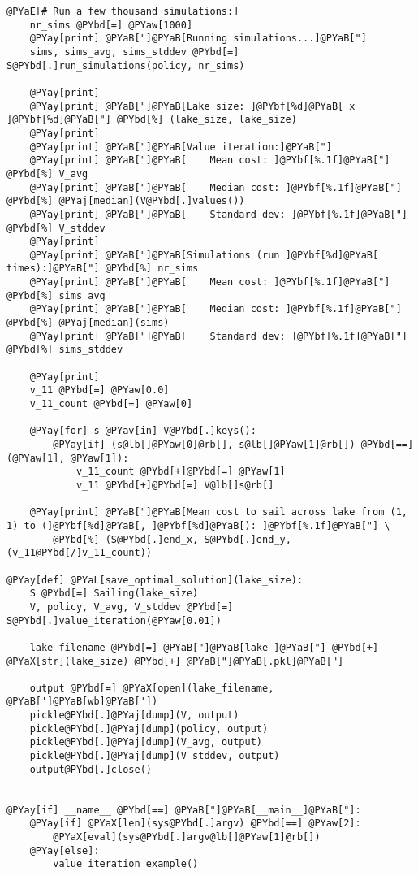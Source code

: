 \begin{Verbatim}[commandchars=@\[\]]
    @PYaE[# Run a few thousand simulations:]
    nr_sims @PYbd[=] @PYaw[1000]
    @PYay[print] @PYaB["]@PYaB[Running simulations...]@PYaB["]
    sims, sims_avg, sims_stddev @PYbd[=] S@PYbd[.]run_simulations(policy, nr_sims)

    @PYay[print]
    @PYay[print] @PYaB["]@PYaB[Lake size: ]@PYbf[%d]@PYaB[ x ]@PYbf[%d]@PYaB["] @PYbd[%] (lake_size, lake_size)
    @PYay[print]
    @PYay[print] @PYaB["]@PYaB[Value iteration:]@PYaB["]
    @PYay[print] @PYaB["]@PYaB[    Mean cost: ]@PYbf[%.1f]@PYaB["] @PYbd[%] V_avg
    @PYay[print] @PYaB["]@PYaB[    Median cost: ]@PYbf[%.1f]@PYaB["] @PYbd[%] @PYaj[median](V@PYbd[.]values())
    @PYay[print] @PYaB["]@PYaB[    Standard dev: ]@PYbf[%.1f]@PYaB["] @PYbd[%] V_stddev
    @PYay[print]
    @PYay[print] @PYaB["]@PYaB[Simulations (run ]@PYbf[%d]@PYaB[ times):]@PYaB["] @PYbd[%] nr_sims
    @PYay[print] @PYaB["]@PYaB[    Mean cost: ]@PYbf[%.1f]@PYaB["] @PYbd[%] sims_avg
    @PYay[print] @PYaB["]@PYaB[    Median cost: ]@PYbf[%.1f]@PYaB["] @PYbd[%] @PYaj[median](sims)
    @PYay[print] @PYaB["]@PYaB[    Standard dev: ]@PYbf[%.1f]@PYaB["] @PYbd[%] sims_stddev

    @PYay[print]
    v_11 @PYbd[=] @PYaw[0.0]
    v_11_count @PYbd[=] @PYaw[0]

    @PYay[for] s @PYav[in] V@PYbd[.]keys():
        @PYay[if] (s@lb[]@PYaw[0]@rb[], s@lb[]@PYaw[1]@rb[]) @PYbd[==] (@PYaw[1], @PYaw[1]):
            v_11_count @PYbd[+]@PYbd[=] @PYaw[1]
            v_11 @PYbd[+]@PYbd[=] V@lb[]s@rb[]

    @PYay[print] @PYaB["]@PYaB[Mean cost to sail across lake from (1, 1) to (]@PYbf[%d]@PYaB[, ]@PYbf[%d]@PYaB[): ]@PYbf[%.1f]@PYaB["] \
        @PYbd[%] (S@PYbd[.]end_x, S@PYbd[.]end_y, (v_11@PYbd[/]v_11_count))

@PYay[def] @PYaL[save_optimal_solution](lake_size):
    S @PYbd[=] Sailing(lake_size)
    V, policy, V_avg, V_stddev @PYbd[=] S@PYbd[.]value_iteration(@PYaw[0.01])

    lake_filename @PYbd[=] @PYaB["]@PYaB[lake_]@PYaB["] @PYbd[+] @PYaX[str](lake_size) @PYbd[+] @PYaB["]@PYaB[.pkl]@PYaB["]

    output @PYbd[=] @PYaX[open](lake_filename, @PYaB[']@PYaB[wb]@PYaB['])
    pickle@PYbd[.]@PYaj[dump](V, output)
    pickle@PYbd[.]@PYaj[dump](policy, output)
    pickle@PYbd[.]@PYaj[dump](V_avg, output)
    pickle@PYbd[.]@PYaj[dump](V_stddev, output)
    output@PYbd[.]close()


@PYay[if] __name__ @PYbd[==] @PYaB["]@PYaB[__main__]@PYaB["]:
    @PYay[if] @PYaX[len](sys@PYbd[.]argv) @PYbd[==] @PYaw[2]:
        @PYaX[eval](sys@PYbd[.]argv@lb[]@PYaw[1]@rb[])
    @PYay[else]:
        value_iteration_example()
\end{Verbatim}
